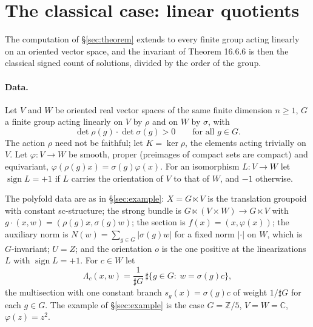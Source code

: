 \documentclass[11pt,a4paper]{article}
\theoremstyle{plain}
\theoremstyle{definition}
\theoremstyle{remark}
\newcommand{\C}{\mathbb{C}}
\newcommand{\Z}{\mathbb{Z}}
\newcommand{\ZZ}{\Z/5}
\newcommand{\abs}[1]{\lvert #1\rvert}
\newcommand{\card}{\sharp}
\begin{document}
\section{The classical case: linear quotients}\label{sec:classical}

The computation of \S\ref{sec:theorem} extends to every finite group acting linearly on an oriented
vector space, and the invariant of Theorem 16.6.6 is then the classical signed count of solutions,
divided by the order of the group.

\paragraph{Data.} Let $V$ and $W$ be oriented real vector spaces of the same finite dimension $n\ge1$,
$G$ a finite group acting linearly on $V$ by $\rho$ and on $W$ by $\sigma$, with
\[
  \det\rho(g)\cdot\det\sigma(g)>0\qquad\text{for all }g\in G .
\]
The action $\rho$ need not be faithful; let $K=\ker\rho$, the elements acting trivially on $V$. Let
$\varphi\colon V\to W$ be smooth, proper (preimages of compact sets are compact) and equivariant,
$\varphi(\rho(g)x)=\sigma(g)\varphi(x)$. For an isomorphism $L\colon V\to W$ let $\operatorname{sign}L=+1$
if $L$ carries the orientation of $V$ to that of $W$, and $-1$ otherwise.

The polyfold data are as in \S\ref{sec:example}: $X=G\ltimes V$ is the translation groupoid with
constant sc-structure; the strong bundle is $G\ltimes(V\times W)\to G\ltimes V$ with
$g\cdot(x,w)=(\rho(g)x,\sigma(g)w)$; the section is $f(x)=(x,\varphi(x))$; the auxiliary norm is
$N(w)=\sum_{g\in G}\abs{\sigma(g)w}$ for a fixed norm $\abs{\cdot}$ on $W$, which is $G$-invariant; $U=Z$;
and the orientation $o$ is the one positive at the linearizations $L$ with $\operatorname{sign}L=+1$.
For $c\in W$ let
\[
  \Lambda_c(x,w)=\frac1{\card G}\,\card\{g\in G:\ w=\sigma(g)c\},
\]
the multisection with one constant branch $s_g(x)=\sigma(g)c$ of weight $1/\card G$ for each $g\in G$.
The example of \S\ref{sec:example} is the case $G=\ZZ$, $V=W=\C$, $\varphi(z)=z^2$.
\end{document}
